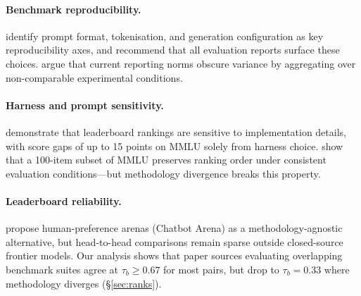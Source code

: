 \documentclass[11pt]{article}
\begin{document}
\paragraph{Benchmark reproducibility.}
\citet{biderman-2024-lessons} identify prompt format, tokenisation, and
generation configuration as key reproducibility axes, and recommend
that all evaluation reports surface these choices.
\citet{burnell-2023-rethink} argue that current reporting norms obscure
variance by aggregating over non-comparable experimental conditions.

\paragraph{Harness and prompt sensitivity.}
\citet{alzahrani-2024-benchmarks} demonstrate that leaderboard rankings
are sensitive to implementation details, with score gaps of up to 15 points
on MMLU solely from harness choice.
\citet{polo-2024-tinybenchmarks} show that a 100-item subset of MMLU
preserves ranking order under consistent evaluation conditions---but
methodology divergence breaks this property.

\paragraph{Leaderboard reliability.}
\citet{chiang-2024-chatbot} propose human-preference arenas (Chatbot Arena)
as a methodology-agnostic alternative, but head-to-head comparisons remain
sparse outside closed-source frontier models.
Our analysis shows that paper sources evaluating overlapping benchmark suites
agree at $\tau_b \geq 0.67$ for most pairs, but drop to $\tau_b = 0.33$ where
methodology diverges (\S\ref{sec:ranks}).
\end{document}
